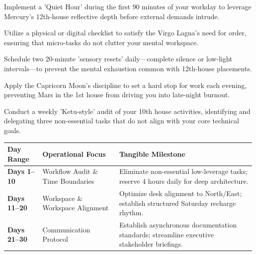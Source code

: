 \begin{diamondlist}
  \item {\fontsize{8.5}{12}\selectfont Implement a 'Quiet Hour' during the first 90 minutes of your workday to leverage Mercury's 12th-house reflective depth before external demands intrude.}
  \item {\fontsize{8.5}{12}\selectfont Utilize a physical or digital checklist to satisfy the Virgo Lagna's need for order, ensuring that micro-tasks do not clutter your mental workspace.}
  \item {\fontsize{8.5}{12}\selectfont Schedule two 20-minute 'sensory resets' daily---complete silence or low-light intervals---to prevent the mental exhaustion common with 12th-house placements.}
  \item {\fontsize{8.5}{12}\selectfont Apply the Capricorn Moon's discipline to set a hard stop for work each evening, preventing Mars in the 1st house from driving you into late-night burnout.}
  \item {\fontsize{8.5}{12}\selectfont Conduct a weekly 'Ketu-style' audit of your 10th house activities, identifying and delegating three non-essential tasks that do not align with your core technical goals.}
\end{diamondlist}


\begin{highlightcard}
  \sffamily\fontsize{8}{11.5}\selectfont
  \begin{tabularx}{\linewidth}{@{}l l X@{}}
    \toprule
    \textbf{Day Range} & \textbf{Operational Focus} & \textbf{Tangible Milestone} \\
    \midrule
    \textbf{Days 1--10} & Workflow Audit \& Time Boundaries & Eliminate non-essential low-leverage tasks; reserve 4 hours daily for deep architecture. \\
    \textbf{Days 11--20} & Workspace \& Workspace Alignment & Optimize desk alignment to North/East; establish structured Saturday recharge rhythm. \\
    \textbf{Days 21--30} & Communication Protocol & Establish asynchronous documentation standards; streamline executive stakeholder briefings. \\
    \bottomrule
  \end{tabularx}
\end{highlightcard}\vspace{2mm}

